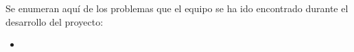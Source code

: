 Se enumeran aquí de los problemas que el equipo se ha ido encontrado durante el desarrollo del proyecto:

\begin{itemize}
	\item 
\end{itemize}
